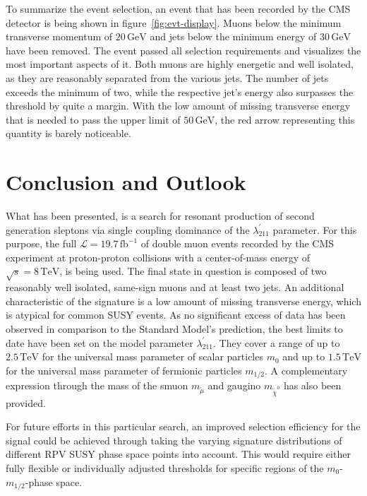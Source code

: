 \noindent To summarize the event selection, an event that has been recorded by the CMS detector is being shown in figure~\ref{fig:evt-display}. Muons below the minimum transverse momentum of $20\,\text{GeV}$ and jets below the minimum energy of $30\,\text{GeV}$ have been removed. The event passed all selection requirements and visualizes the most important aspects of it. Both muons are highly energetic and well isolated, as they are reasonably separated from the various jets. The number of jets exceeds the minimum of two, while the respective jet's energy also surpasses the threshold by quite a margin. With the low amount of missing transverse energy that is needed to pass the upper limit of $50\,\text{GeV}$, the red arrow representing this quantity is barely noticeable.

\section{Conclusion and Outlook}
\label{sec:conclusion}

What has been presented, is a search for resonant production of second generation sleptons via single coupling dominance of the $\lambda^{\prime}_{211}$ parameter. For this purpose, the full $\mathcal{L} = 19.7\,\text{fb}^{-1}$ of double muon events recorded by the CMS experiment at proton-proton collisions with a center-of-mass energy of $\sqrt{s} = 8\,\text{TeV}$, is being used. The final state in question is composed of two reasonably well isolated, same-sign muons and at least two jets. An additional characteristic of the signature is a low amount of missing transverse energy, which is atypical for common SUSY events. As no significant excess of data has been observed in comparison to the Standard Model's prediction, the best limits to date have been set on the model parameter $\lambda^{\prime}_{211}$. They cover a range of up to $2.5\,\text{TeV}$ for the universal mass parameter of scalar particles $m_0$ and up to $1.5\,\text{TeV}$ for the universal mass parameter of fermionic particles $m_{1/2}$. A complementary expression through the mass of the smuon $m_{\tilde{\mu}}$ and gaugino $m_{\tilde{\chi}^0}$ has also been provided.

For future efforts in this particular search, an improved selection efficiency for the signal could be achieved through taking the varying signature distributions of different RPV SUSY phase space points into account. This would require either fully flexible or individually adjusted thresholds for specific regions of the $m_0$-$m_{1/2}$-phase space.


